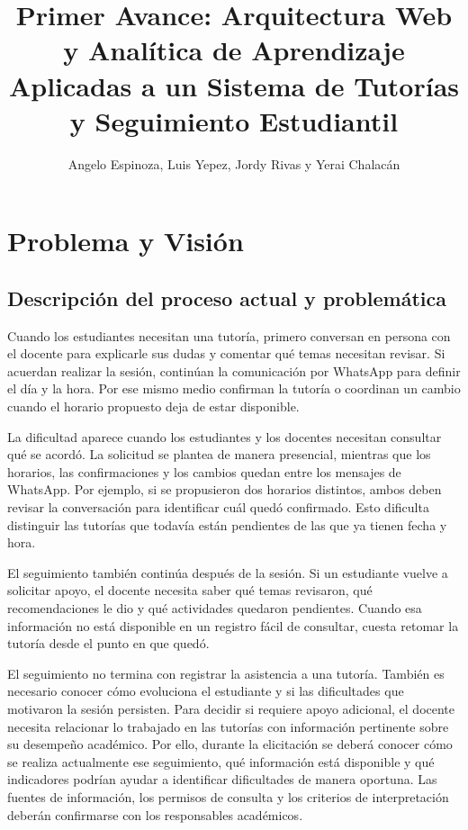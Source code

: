 \documentclass[11pt, a4paper]{article}
\title{Primer Avance: Arquitectura Web y Analítica de Aprendizaje Aplicadas a un Sistema de Tutorías y Seguimiento Estudiantil}
\author{Angelo Espinoza, Luis Yepez, Jordy Rivas y Yerai Chalacán}
\date{}
\begin{document}
\maketitle

\section{Problema y Visión}
\subsection{Descripción del proceso actual y problemática}

Cuando los estudiantes necesitan una tutoría, primero conversan en persona
con el docente para explicarle sus dudas y comentar qué temas necesitan
revisar. Si acuerdan realizar la sesión, continúan la comunicación por
WhatsApp para definir el día y la hora. Por ese mismo medio confirman
la tutoría o coordinan un cambio cuando el horario propuesto deja
de estar disponible.

La dificultad aparece cuando los estudiantes y los docentes necesitan
consultar qué se acordó. La solicitud se plantea de manera presencial,
mientras que los horarios, las confirmaciones y los cambios quedan entre
los mensajes de WhatsApp. Por ejemplo, si se propusieron dos horarios
distintos, ambos deben revisar la conversación para identificar cuál
quedó confirmado. Esto dificulta distinguir las tutorías que todavía
están pendientes de las que ya tienen fecha y hora.

El seguimiento también continúa después de la sesión. Si un estudiante
vuelve a solicitar apoyo, el docente necesita saber qué temas revisaron,
qué recomendaciones le dio y qué actividades quedaron pendientes.
Cuando esa información no está disponible en un registro fácil de
consultar, cuesta retomar la tutoría desde el punto en que quedó.

El seguimiento no termina con registrar la asistencia a una tutoría.
También es necesario conocer cómo evoluciona el estudiante y si las
dificultades que motivaron la sesión persisten. Para decidir si requiere
apoyo adicional, el docente necesita relacionar lo trabajado en las
tutorías con información pertinente sobre su desempeño académico.
Por ello, durante la elicitación se deberá conocer cómo se realiza
actualmente ese seguimiento, qué información está disponible y qué
indicadores podrían ayudar a identificar dificultades de manera
oportuna. Las fuentes de información, los permisos de consulta y los
criterios de interpretación deberán confirmarse con los responsables
académicos.
\end{document}

